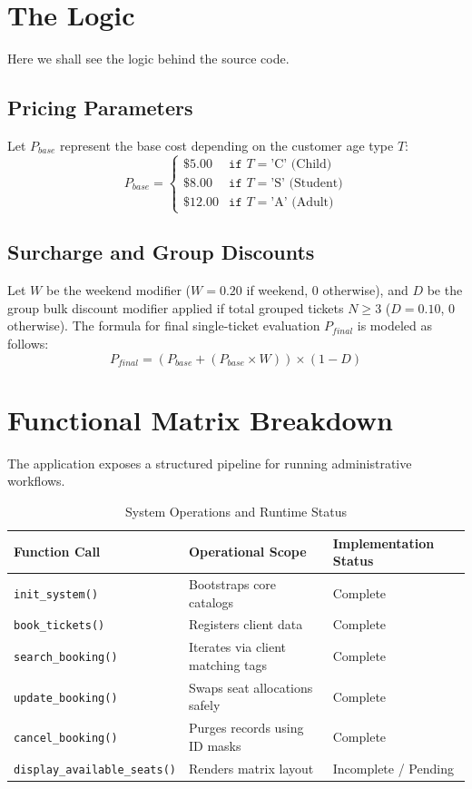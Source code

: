 \documentclass[12pt,a4paper]{article}
\begin{document}
\section{The Logic}
Here we shall see the logic behind the source code.

\subsection{Pricing Parameters}
Let $P_{base}$ represent the base cost depending on the customer age type $T$:
\begin{equation}
P_{base} = 
\begin{cases}
\$5.00 & \texttt{if } T = \text{'C' (Child)} \\
\$8.00 & \texttt{if } T = \text{'S' (Student)} \\
\$12.00 & \texttt{if } T = \text{'A' (Adult)} 
\end{cases}
\end{equation}

\subsection{Surcharge and Group Discounts}
Let $W$ be the weekend modifier ($W = 0.20$ if weekend, $0$ otherwise), and $D$ be the group bulk discount modifier applied if total grouped tickets $N \ge 3$ ($D = 0.10$, $0$ otherwise). The formula for final single-ticket evaluation $P_{final}$ is modeled as follows:
\begin{equation}
P_{final} = (P_{base} + (P_{base} \times W)) \times (1 - D)
\end{equation}

\section{Functional Matrix Breakdown}
The application exposes a structured pipeline for running administrative workflows.

\begin{table}[h!]
\centering
\caption{System Operations and Runtime Status}
\begin{tabular}{lll}
\toprule
\textbf{Function Call} & \textbf{Operational Scope} & \textbf{Implementation Status} \\
\midrule
\texttt{init\_system()} & Bootstraps core catalogs & Complete \\
\texttt{book\_tickets()} & Registers client data & Complete \\
\texttt{search\_booking()} & Iterates via client matching tags & Complete \\
\texttt{update\_booking()} & Swaps seat allocations safely & Complete \\
\texttt{cancel\_booking()} & Purges records using ID masks & Complete \\
\texttt{display\_available\_seats()} & Renders matrix layout & Incomplete / Pending \\
\bottomrule
\end{tabular}
\label{tab:functions}
\end{table}
\end{document}
